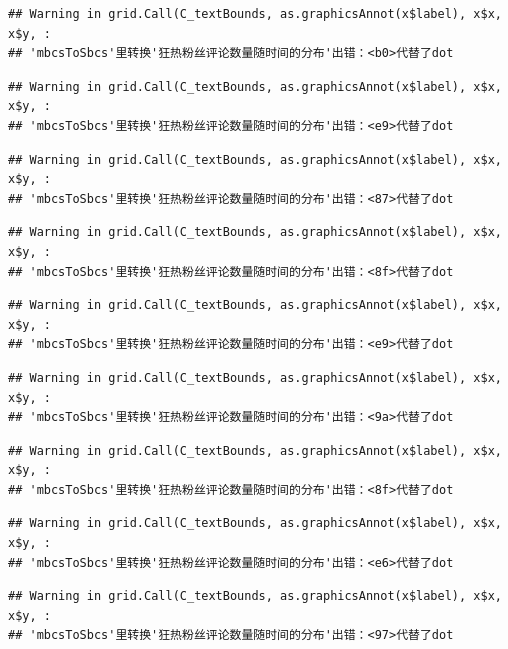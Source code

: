 \documentclass[
]{article}
\begin{document}
\begin{verbatim}
## Warning in grid.Call(C_textBounds, as.graphicsAnnot(x$label), x$x, x$y, :
## 'mbcsToSbcs'里转换'狂热粉丝评论数量随时间的分布'出错：<b0>代替了dot
\end{verbatim}

\begin{verbatim}
## Warning in grid.Call(C_textBounds, as.graphicsAnnot(x$label), x$x, x$y, :
## 'mbcsToSbcs'里转换'狂热粉丝评论数量随时间的分布'出错：<e9>代替了dot
\end{verbatim}

\begin{verbatim}
## Warning in grid.Call(C_textBounds, as.graphicsAnnot(x$label), x$x, x$y, :
## 'mbcsToSbcs'里转换'狂热粉丝评论数量随时间的分布'出错：<87>代替了dot
\end{verbatim}

\begin{verbatim}
## Warning in grid.Call(C_textBounds, as.graphicsAnnot(x$label), x$x, x$y, :
## 'mbcsToSbcs'里转换'狂热粉丝评论数量随时间的分布'出错：<8f>代替了dot
\end{verbatim}

\begin{verbatim}
## Warning in grid.Call(C_textBounds, as.graphicsAnnot(x$label), x$x, x$y, :
## 'mbcsToSbcs'里转换'狂热粉丝评论数量随时间的分布'出错：<e9>代替了dot
\end{verbatim}

\begin{verbatim}
## Warning in grid.Call(C_textBounds, as.graphicsAnnot(x$label), x$x, x$y, :
## 'mbcsToSbcs'里转换'狂热粉丝评论数量随时间的分布'出错：<9a>代替了dot
\end{verbatim}

\begin{verbatim}
## Warning in grid.Call(C_textBounds, as.graphicsAnnot(x$label), x$x, x$y, :
## 'mbcsToSbcs'里转换'狂热粉丝评论数量随时间的分布'出错：<8f>代替了dot
\end{verbatim}

\begin{verbatim}
## Warning in grid.Call(C_textBounds, as.graphicsAnnot(x$label), x$x, x$y, :
## 'mbcsToSbcs'里转换'狂热粉丝评论数量随时间的分布'出错：<e6>代替了dot
\end{verbatim}

\begin{verbatim}
## Warning in grid.Call(C_textBounds, as.graphicsAnnot(x$label), x$x, x$y, :
## 'mbcsToSbcs'里转换'狂热粉丝评论数量随时间的分布'出错：<97>代替了dot
\end{verbatim}
\end{document}

